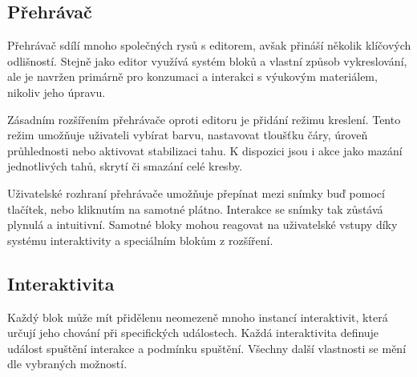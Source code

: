 



\subsection{Přehrávač}

Přehrávač sdílí mnoho společných rysů s editorem, avšak přináší několik klíčových odlišností. 
Stejně jako editor využívá systém bloků a vlastní způsob vykreslování, ale je navržen primárně pro konzumaci a interakci s výukovým materiálem, nikoliv jeho úpravu.

Zásadním rozšířením přehrávače oproti editoru je přidání režimu kreslení. 
Tento režim umožňuje uživateli vybírat barvu, nastavovat tloušťku čáry, úroveň průhlednosti nebo aktivovat stabilizaci tahu. 
K dispozici jsou i akce jako mazání jednotlivých tahů, skrytí či smazání celé kresby.

Uživatelské rozhraní přehrávače umožňuje přepínat mezi snímky buď pomocí tlačítek, nebo kliknutím na samotné plátno.
Interakce se snímky tak zůstává plynulá a intuitivní. 
Samotné bloky mohou reagovat na uživatelské vstupy díky systému interaktivity a speciálním blokům z rozšíření.

\subsection{Interaktivita}

Každý blok může mít přidělenu neomezeně mnoho instancí interaktivit, která určují jeho chování při specifických událostech. 
Každá interaktivita definuje událost spuštění interakce a podmínku spuštění.
Všechny další vlastnosti se mění dle vybraných možností.

